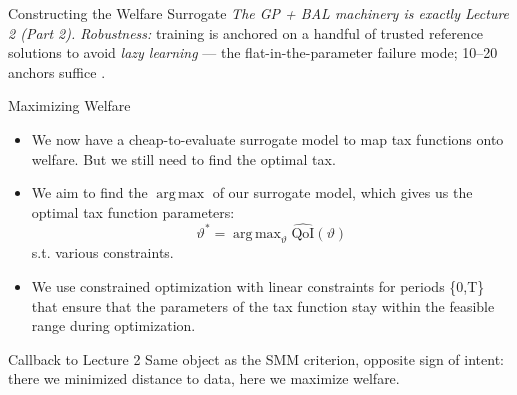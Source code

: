\documentclass[aspectratio=169,11pt]{beamer}
\newcommand{\keyc}[1]{\textcolor{uzhblue}{#1}}
\DeclareMathOperator*{\argmax}{arg\,max}
\begin{document}
\begin{frame}{Constructing the Welfare Surrogate}
\vspace{0.2em}
{\footnotesize \emph{The GP + BAL machinery is exactly Lecture 2 (Part 2). Robustness:} training is anchored on a handful of trusted reference solutions to avoid \emph{lazy learning} --- the flat-in-the-parameter failure mode; 10--20 anchors suffice \citep{friedlDeep2023}.}
\end{frame}

\begin{frame}{Maximizing Welfare}
\small
\begin{itemize}
    \item We now have a cheap-to-evaluate surrogate model to map \keyc{tax functions onto welfare}. But we still need to find the optimal tax.
    \vspace{0.15cm}
    \item We aim to \keyc{find the $\argmax$ of our surrogate model}, which gives us the optimal tax function parameters:
    \[
       \vartheta^* = \argmax_{\vartheta} \widehat{\mathrm{QoI}}(\vartheta)
    \]
    s.t. various constraints.
    \vspace{0.15cm}
    \item We use \keyc{constrained optimization with linear constraints} for periods \{0,T\} that ensure that the parameters of the tax function stay within the feasible range during optimization.
    \end{itemize}
\vspace{0.15cm}
\begin{block}{Callback to Lecture 2}
Same object as the SMM criterion, opposite sign of intent: there we minimized distance to data, here we maximize welfare.
\end{block}
\end{frame}
\end{document}
